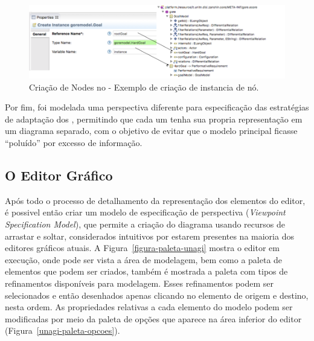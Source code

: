 \begin{figure}
	\centering
	\includegraphics[width=1\textwidth]{figuras/unagi/exemplo-propriedades-create-instance.png}
	\caption{Criação de Nodes no \sirius - Exemplo de criação de instancia de nó.}
	\label{figura-propriedades-create-instance}
\end{figure}

Por fim, foi modelada uma perspectiva diferente para especificação das estratégias de adaptação dos \awreqs, permitindo que cada um tenha sua propria representação em um diagrama separado, com o objetivo de evitar que o modelo principal ficasse ``poluído'' por excesso de informação. 

\subsection{O Editor Gráfico}
\label{sec-unagi-apresentacao-editor}

Após todo o processo de detalhamento da representação dos elementos do editor, é possivel então criar um modelo de especificação de perspectiva (\textit{Viewpoint Specification Model}), que permite a criação do diagrama usando recursos de arrastar e soltar, considerados intuitivos por estarem presentes na maioria dos editores gráficos atuais. A Figura~\ref{figura-paleta-unagi} mostra o editor em execução, onde pode ser vista a área de modelagem, bem como a paleta de elementos que podem ser criados, também é mostrada a paleta com tipos de refinamentos disponíveis para modelagem. Esses refinamentos podem ser selecionados e então desenhados apenas clicando no elemento de origem e destino, nesta ordem. As propriedades relativas a cada elemento do modelo podem ser modificadas por meio da paleta de opções que aparece na área inferior do editor (Figura~\ref{unagi-paleta-opcoes}).

